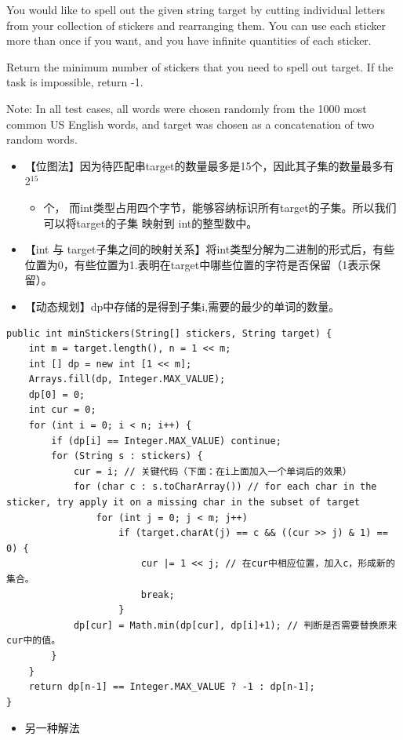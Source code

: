 \documentclass[9pt, b5paper]{article}
\begin{document}
You would like to spell out the given string target by cutting individual letters from your collection of stickers and rearranging them. You can use each sticker more than once if you want, and you have infinite quantities of each sticker.

Return the minimum number of stickers that you need to spell out target. If the task is impossible, return -1.

Note: In all test cases, all words were chosen randomly from the 1000 most common US English words, and target was chosen as a concatenation of two random words.
\begin{itemize}
\item 【位图法】因为待匹配串target的数量最多是15个，因此其子集的数量最多有 2$^{\text{15}}$ 
\begin{itemize}
\item 个， 而int类型占用四个字节，能够容纳标识所有target的子集。所以我们可以将target的子集 映射到 int的整型数中。
\end{itemize}
\item 【int 与 target子集之间的映射关系】将int类型分解为二进制的形式后，有些位置为0，有些位置为1.表明在target中哪些位置的字符是否保留（1表示保留）。
\item 【动态规划】dp中存储的是得到子集i,需要的最少的单词的数量。
\end{itemize}
\begin{verbatim}
public int minStickers(String[] stickers, String target) {
    int m = target.length(), n = 1 << m;
    int [] dp = new int [1 << m];
    Arrays.fill(dp, Integer.MAX_VALUE);
    dp[0] = 0;
    int cur = 0;
    for (int i = 0; i < n; i++) {
        if (dp[i] == Integer.MAX_VALUE) continue;
        for (String s : stickers) {
            cur = i; // 关键代码（下面：在i上面加入一个单词后的效果）
            for (char c : s.toCharArray()) // for each char in the sticker, try apply it on a missing char in the subset of target
                for (int j = 0; j < m; j++) 
                    if (target.charAt(j) == c && ((cur >> j) & 1) == 0) {
                        cur |= 1 << j; // 在cur中相应位置，加入c，形成新的集合。
                        break;
                    }
            dp[cur] = Math.min(dp[cur], dp[i]+1); // 判断是否需要替换原来cur中的值。
        }
    }
    return dp[n-1] == Integer.MAX_VALUE ? -1 : dp[n-1];
}
\end{verbatim}
\begin{itemize}
\item 另一种解法
\end{itemize}
\end{document}
